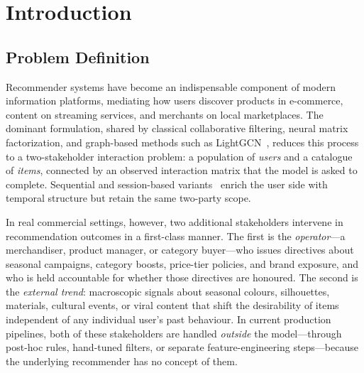 \documentclass[master,english,final]{postech-ucs}
\begin{document}
    \tableofcontents

    \listoftables

    \listoffigures





\chapter{Introduction}

\section{Problem Definition}

Recommender systems have become an indispensable component of modern information platforms, mediating how users discover products in e-commerce, content on streaming services, and merchants on local marketplaces.
The dominant formulation, shared by classical collaborative filtering, neural matrix factorization, and graph-based methods such as LightGCN~\cite{he2020lightgcn}, reduces this process to a two-stakeholder interaction problem: a population of \emph{users} and a catalogue of \emph{items}, connected by an observed interaction matrix that the model is asked to complete.
Sequential and session-based variants~\cite{kang2018self,sun2019bert4rec} enrich the user side with temporal structure but retain the same two-party scope.

In real commercial settings, however, two additional stakeholders intervene in recommendation outcomes in a first-class manner.
The first is the \emph{operator}---a merchandiser, product manager, or category buyer---who issues directives about seasonal campaigns, category boosts, price-tier policies, and brand exposure, and who is held accountable for whether those directives are honoured.
The second is the \emph{external trend}: macroscopic signals about seasonal colours, silhouettes, materials, cultural events, or viral content that shift the desirability of items independent of any individual user's past behaviour.
In current production pipelines, both of these stakeholders are handled \emph{outside} the model---through post-hoc rules, hand-tuned filters, or separate feature-engineering steps---because the underlying recommender has no concept of them.
\end{document}

